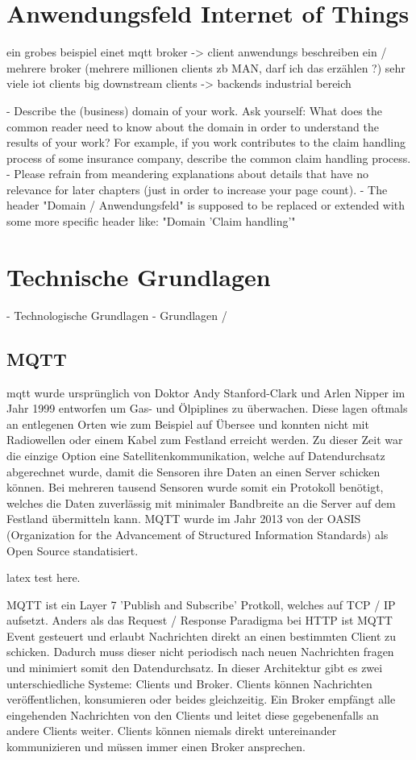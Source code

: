 \section{Anwendungsfeld Internet of Things}

ein grobes beispiel einet mqtt broker -> client anwendungs beschreiben
ein / mehrere broker (mehrere millionen clients zb MAN, darf ich das erzählen ?)
sehr viele iot clients
big downstream clients -> backends
industrial bereich

- Describe the (business) domain of your work. Ask yourself: What does the common reader need to know about the domain in order to understand the results of your work? For example, if you work contributes to the claim handling process of some insurance company, describe the common claim handling process.
- Please refrain from meandering explanations about details that have no relevance for later chapters (just in order to increase your page count).
- The header "Domain / Anwendungsfeld" is supposed to be replaced or extended with some more specific header like: "Domain 'Claim handling'"

\section{Technische Grundlagen} - Technologische Grundlagen - Grundlagen /

\subsection{MQTT}
\acrfull{mqtt} wurde ursprünglich von Doktor Andy Stanford-Clark und Arlen Nipper im Jahr 1999 entworfen um Gas- und Ölpiplines zu überwachen. Diese lagen oftmals an entlegenen Orten wie zum Beispiel auf Übersee und konnten nicht mit Radiowellen oder einem Kabel zum Festland erreicht werden. Zu dieser Zeit war die einzige Option eine Satellitenkommunikation, welche auf Datendurchsatz abgerechnet wurde, damit die Sensoren ihre Daten an einen Server schicken können. Bei mehreren tausend Sensoren wurde somit ein Protokoll benötigt, welches die Daten zuverlässig mit minimaler Bandbreite an die Server auf dem Festland übermitteln kann.
MQTT wurde im Jahr 2013 von der OASIS (Organization for the Advancement of Structured Information Standards) als Open Source standatisiert.

\Gls{latex} test here.

MQTT ist ein Layer 7 'Publish and Subscribe' Protkoll, welches auf TCP / IP aufsetzt. Anders als das Request / Response Paradigma bei HTTP ist MQTT Event gesteuert und erlaubt Nachrichten direkt an einen bestimmten Client zu schicken. Dadurch muss dieser nicht periodisch nach neuen Nachrichten fragen und minimiert somit den Datendurchsatz.
In dieser Architektur gibt es zwei unterschiedliche Systeme: Clients und Broker. Clients können Nachrichten veröffentlichen, konsumieren oder beides gleichzeitig.
Ein Broker empfängt alle eingehenden Nachrichten von den Clients und leitet diese gegebenenfalls an andere Clients weiter. Clients können niemals direkt untereinander kommunizieren und müssen immer einen Broker ansprechen.

